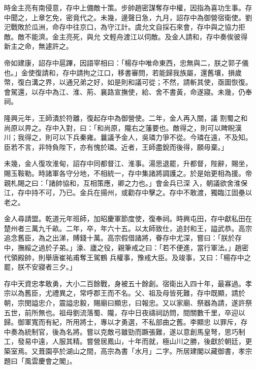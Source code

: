 \begin{pinyinscope}
 時金主亮有南侵意，存中上備敵十策。步帥趙密謀奪存中權，因指為喜功生事。存中聞之，上章乞免，密竟代之。未幾，邊聲日急，九月，詔存中為御營宿衛使。劉汜戰敗於瓜洲，命存中往京口，為守江計。虞允文自採石來會，存中與之協力拒敵。敵不能濟。金主亮死，與允
 文輕舟渡江以伺敵。及金人請和，存中奏俟彼得新主之命，無遽許之。



 帝如建康，詔存中扈蹕，因語宰相曰：「楊存中唯命東西，忠無與二，朕之郭子儀也。」金使復請和，存中請拘之江口，移書審問，若能歸我族屬，還舊壤，損歲幣，復白溝之界，以通兄弟之好，如是則和議可從；不然，請斬其使，亟圖恢復。會駕還，以存中為江、淮、荊、襄路宣撫使，給、舍不書黃，命遂寢。未幾，仍奉祠。



 隆興元年，王師潰於符離，復起存中為御營使。二年，金人再入關，議
 割蜀之和尚原以畀之。存中入對，曰：「和尚原，隴右之藩要也。敵得之，則可以睥睨漢川；我得之，則可以下兵秦雍。曩議予金人，吳璘力爭不從。今璘在遠，不及知。臣若不言，非特負陛下，亦有愧於璘。近者，王師盡銳而後得，願毋棄。」



 未幾，金人復攻淮甸，詔存中同都督江、淮事。湯思退罷，升都督，陛辭，賜坐，賜玉鞍勒。時諸軍各守分地，不相統一，存中集諸將調護之。於是始更相為援。帝親札賜之曰：「諸帥協和，互相策應，卿之力也。」會金兵已深
 入，朝議欲舍淮保江，存中持不可，乃已。金兵在揚州，或勸存中擊之。存中不敢渡，獨臨江固壘以老之。



 金人尋請盟。乾道元年班師，加昭慶軍節度使，復奉祠。時興屯田，存中獻私田在楚州者三萬九千畝。二年，卒，年六十五。以太師致仕，追封和王，謚武恭。高宗追念舊臣，為之出涕，賻錢十萬。高宗假借諸將，眷存中尤深，嘗曰：「朕於存中，撫綏之過於子弟。」濠、廬之役，親筆戒之曰：「若不便進，當行軍法。」趙密代領殿帥，則舉唐崔祐甫奪王駕鶴
 兵權事，豫戒大臣。及竣事，又曰：「楊存中之罷，朕不安寢者三夕。」



 存中天資忠孝敢勇，大小二百餘戰，身被五十餘創。宿衛出入四十年，最寡過。孝宗以為舊臣，尤禮異之，常呼郡王而不名。父、祖及母皆死難，存中既顯，請於朝，宗閔謚忠介，震謚忠毅，賜廟曰顯忠，曰報忠。又以家廟、祭器為請，遂許祭五世，前所無也。祖母劉流落蜀、隴，存中日夜禱祠訪問，間關數千里，卒迎以歸。御軍寬而有紀，所用將士，專以才勇選，不私部曲之舊。李顯忠
 以罪斥，存中奏為統制官，後為名將。嘗以克敵弓雖勁而蹶張難，遂以意創馬皇弩，思巧制工，發易中遠，人服其精。嘗營居鳳山，十年而就，極山川之勝，後獻於朝廷，更築室焉。又葺園亭於湖山之間，高宗為書「水月」二字。所居建閣以藏御書，孝宗題曰「風雲慶會之閣」。




\end{pinyinscope}
